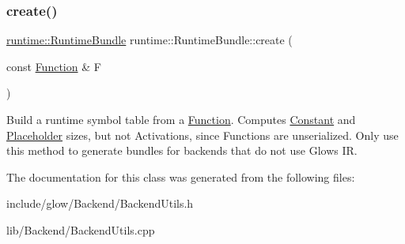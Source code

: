 \subsubsection{\texorpdfstring{create()}{create()}\hspace{0.1cm}{\footnotesize\ttfamily [4/4]}}
{\footnotesize\ttfamily \hyperlink{classglow_1_1runtime_1_1_runtime_bundle}{runtime\+::\+Runtime\+Bundle} runtime\+::\+Runtime\+Bundle\+::create (\begin{DoxyParamCaption}\item[{const \hyperlink{classglow_1_1_function}{Function} \&}]{F }\end{DoxyParamCaption})\hspace{0.3cm}{\ttfamily [static]}}

Build a runtime symbol table from a \hyperlink{classglow_1_1_function}{Function}. Computes \hyperlink{classglow_1_1_constant}{Constant} and \hyperlink{classglow_1_1_placeholder}{Placeholder} sizes, but not Activations, since Functions are unserialized. Only use this method to generate bundles for backends that do not use Glow\textquotesingle{}s IR. 

The documentation for this class was generated from the following files\+:\begin{DoxyCompactItemize}
\item 
include/glow/\+Backend/Backend\+Utils.\+h\item 
lib/\+Backend/Backend\+Utils.\+cpp\end{DoxyCompactItemize}
